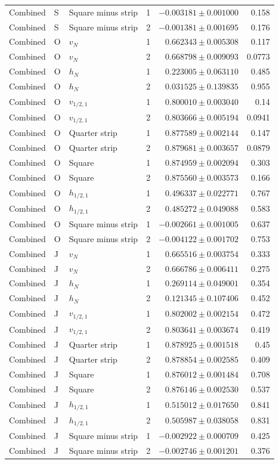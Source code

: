 {\begin{longtable}{lllrrr}
Combined & S & Square minus strip & 1 & $-0.003181\pm0.001000$ & 0.158\\
Combined & S & Square minus strip & 2 & $-0.001381\pm0.001695$ & 0.176\\
Combined & O & $v_N$ & 1 & $0.662343\pm0.005308$ & 0.117\\
Combined & O & $v_N$ & 2 & $0.668798\pm0.009093$ & 0.0773\\
Combined & O & $h_N$ & 1 & $0.223005\pm0.063110$ & 0.485\\
Combined & O & $h_N$ & 2 & $0.031525\pm0.139835$ & 0.955\\
Combined & O & $v_{1/2,1}$ & 1 & $0.800010\pm0.003040$ & 0.14\\
Combined & O & $v_{1/2,1}$ & 2 & $0.803666\pm0.005194$ & 0.0941\\
Combined & O & Quarter strip & 1 & $0.877589\pm0.002144$ & 0.147\\
Combined & O & Quarter strip & 2 & $0.879681\pm0.003657$ & 0.0879\\
Combined & O & Square & 1 & $0.874959\pm0.002094$ & 0.303\\
Combined & O & Square & 2 & $0.875560\pm0.003573$ & 0.166\\
Combined & O & $h_{1/2,1}$ & 1 & $0.496337\pm0.022771$ & 0.767\\
Combined & O & $h_{1/2,1}$ & 2 & $0.485272\pm0.049088$ & 0.583\\
Combined & O & Square minus strip & 1 & $-0.002661\pm0.001005$ & 0.637\\
Combined & O & Square minus strip & 2 & $-0.004122\pm0.001702$ & 0.753\\
Combined & J & $v_N$ & 1 & $0.665516\pm0.003754$ & 0.333\\
Combined & J & $v_N$ & 2 & $0.666786\pm0.006411$ & 0.275\\
Combined & J & $h_N$ & 1 & $0.269114\pm0.049001$ & 0.354\\
Combined & J & $h_N$ & 2 & $0.121345\pm0.107406$ & 0.452\\
Combined & J & $v_{1/2,1}$ & 1 & $0.802002\pm0.002154$ & 0.472\\
Combined & J & $v_{1/2,1}$ & 2 & $0.803641\pm0.003674$ & 0.419\\
Combined & J & Quarter strip & 1 & $0.878925\pm0.001518$ & 0.45\\
Combined & J & Quarter strip & 2 & $0.878854\pm0.002585$ & 0.409\\
Combined & J & Square & 1 & $0.876012\pm0.001484$ & 0.708\\
Combined & J & Square & 2 & $0.876146\pm0.002530$ & 0.537\\
Combined & J & $h_{1/2,1}$ & 1 & $0.515012\pm0.017650$ & 0.841\\
Combined & J & $h_{1/2,1}$ & 2 & $0.505987\pm0.038058$ & 0.831\\
Combined & J & Square minus strip & 1 & $-0.002922\pm0.000709$ & 0.425\\
Combined & J & Square minus strip & 2 & $-0.002746\pm0.001201$ & 0.376\\
\end{longtable}}
